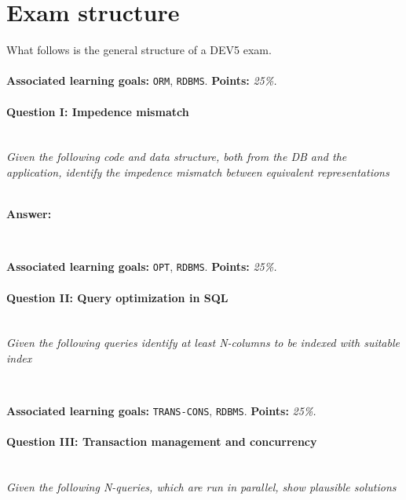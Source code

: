 \section*{Exam structure}
What follows is the general structure of a DEV5 exam.
\\ 
\\
\textbf{Associated learning goals:} \texttt{ORM}, \texttt{RDBMS}.
\textbf{Points:} \textit{25\%.}
\paragraph{Question I: Impedence mismatch} \ \\

\textit{Given the following code and data structure, both from the DB and the application, identify the impedence mismatch between equivalent representations} 

\ \\


\textbf{Answer:} \textit{}

\begin{lstlisting}
\end{lstlisting}


\ \\ 
\textbf{Associated learning goals:} \texttt{OPT}, \texttt{RDBMS}.
\textbf{Points:} \textit{25\%.}
\paragraph{Question II: Query optimization in SQL} \ \\ 

\textit{Given the following queries identify at least N-columns to be indexed with suitable index}

\begin{lstlisting}
\end{lstlisting}

\ \\ 

\textbf{Associated learning goals:} \texttt{TRANS-CONS}, \texttt{RDBMS}.
\textbf{Points:} \textit{25\%.}
\paragraph{Question III: Transaction management and concurrency}

\ \\ 

\textit{Given the following N-queries, which are run in parallel, show plausible solutions }
\begin{lstlisting}
\end{lstlisting}


